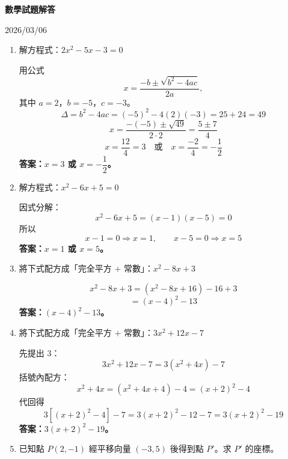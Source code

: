 \documentclass[a4paper,12pt]{article}
\newcommand{\examdate}{2026/03/06}
\newenvironment{solutionbox}{\begin{framed}}{\end{framed}}
\begin{document}
\begin{center}
{\Large\bfseries 數學試題解答}
\end{center}

\begin{flushright}
\examdate
\end{flushright}

\vspace{1em}

\begin{enumerate}[label=\textbf{\arabic*.}, leftmargin=2em, itemsep=1.2em]

\item 解方程式：$2x^2 - 5x - 3 = 0$

\begin{solutionbox}
用公式
\[
x=\frac{-b\pm\sqrt{b^2-4ac}}{2a},
\]
其中 $a=2$，$b=-5$，$c=-3$。
\[
\Delta=b^2-4ac=(-5)^2-4(2)(-3)=25+24=49
\]
\[
x=\frac{-(-5)\pm\sqrt{49}}{2\cdot 2}
=\frac{5\pm 7}{4}
\]
\[
x=\frac{12}{4}=3
\quad \text{或} \quad
x=\frac{-2}{4}=-\frac{1}{2}
\]
\textbf{答案：$x=3$ 或 $x=-\dfrac{1}{2}$。}
\end{solutionbox}

\item 解方程式：$x^2 - 6x + 5 = 0$

\begin{solutionbox}
因式分解：
\[
x^2-6x+5=(x-1)(x-5)=0
\]
所以
\[
x-1=0 \Rightarrow x=1,
\qquad
x-5=0 \Rightarrow x=5
\]
\textbf{答案：$x=1$ 或 $x=5$。}
\end{solutionbox}

\item 將下式配方成「完全平方 $+$ 常數」：$x^2 - 8x + 3$

\begin{solutionbox}
\[
x^2-8x+3=(x^2-8x+16)-16+3
\]
\[
=(x-4)^2-13
\]
\textbf{答案：$(x-4)^2-13$。}
\end{solutionbox}

\item 將下式配方成「完全平方 $+$ 常數」：$3x^2 + 12x - 7$

\begin{solutionbox}
先提出 $3$：
\[
3x^2+12x-7=3(x^2+4x)-7
\]
括號內配方：
\[
x^2+4x=(x^2+4x+4)-4=(x+2)^2-4
\]
代回得
\[
3[(x+2)^2-4]-7=3(x+2)^2-12-7=3(x+2)^2-19
\]
\textbf{答案：$3(x+2)^2-19$。}
\end{solutionbox}

\item 已知點 $P(2,-1)$ 經平移向量 $(-3,5)$ 後得到點 $P'$。求 $P'$ 的座標。


\end{enumerate}
\end{document}
